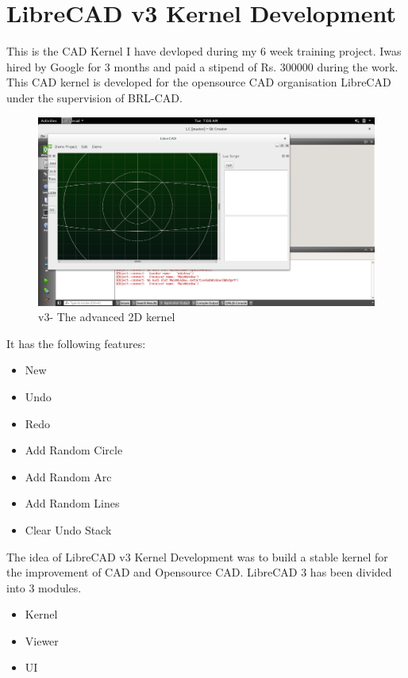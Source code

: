 \section{LibreCAD v3 Kernel Development}
This is the CAD Kernel I have devloped during my 6 week training project. Iwas hired by Google for 3 months and paid a stipend of Rs. 300000 during the work. This CAD kernel is developed for the opensource CAD organisation LibreCAD under the supervision of BRL-CAD. 
\begin{figure}[h]
\begin{center}
\includegraphics[scale=0.3]{images/cad/simplerun.png}
\caption{v3- The advanced 2D kernel}
\end{center}
\end{figure}

It has the following features:
\begin{itemize}
\item New
\item Undo
\item Redo
\item Add Random Circle
\item Add Random Arc
\item Add Random Lines
\item Clear Undo Stack
\end{itemize}

The idea of LibreCAD v3 Kernel Development was to build a stable kernel for the improvement of CAD and Opensource CAD. LibreCAD 3 has been divided into 3 modules.

\begin{itemize}
\item Kernel
\item Viewer
\item UI
\end{itemize}

